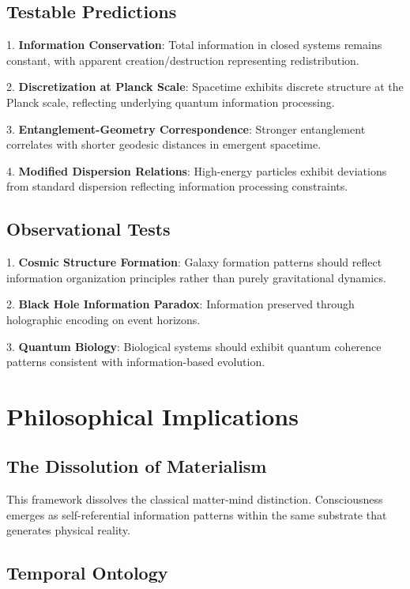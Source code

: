 \documentclass[12pt]{article}
\begin{document}
\subsection{Testable Predictions}

1. \textbf{Information Conservation}: Total information in closed systems remains constant, with apparent creation/destruction representing redistribution.

2. \textbf{Discretization at Planck Scale}: Spacetime exhibits discrete structure at the Planck scale, reflecting underlying quantum information processing.

3. \textbf{Entanglement-Geometry Correspondence}: Stronger entanglement correlates with shorter geodesic distances in emergent spacetime.

4. \textbf{Modified Dispersion Relations}: High-energy particles exhibit deviations from standard dispersion reflecting information processing constraints.

\subsection{Observational Tests}

1. \textbf{Cosmic Structure Formation}: Galaxy formation patterns should reflect information organization principles rather than purely gravitational dynamics.

2. \textbf{Black Hole Information Paradox}: Information preserved through holographic encoding on event horizons.

3. \textbf{Quantum Biology}: Biological systems should exhibit quantum coherence patterns consistent with information-based evolution.

\section{Philosophical Implications}

\subsection{The Dissolution of Materialism}

This framework dissolves the classical matter-mind distinction. Consciousness emerges as self-referential information patterns within the same substrate that generates physical reality.

\subsection{Temporal Ontology}
\end{document}
